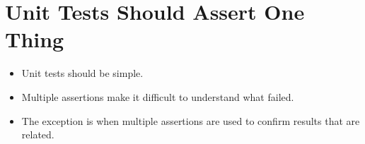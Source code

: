 \documentclass{article}
\begin{document}
\sloppy
\section{Unit Tests Should Assert One Thing}
\begin{itemize}
    \item Unit tests should be simple.
    \item Multiple assertions make it difficult to understand what failed.
    \item The exception is when multiple assertions are used to confirm results
        that are related.
\end{itemize}
\end{document}
